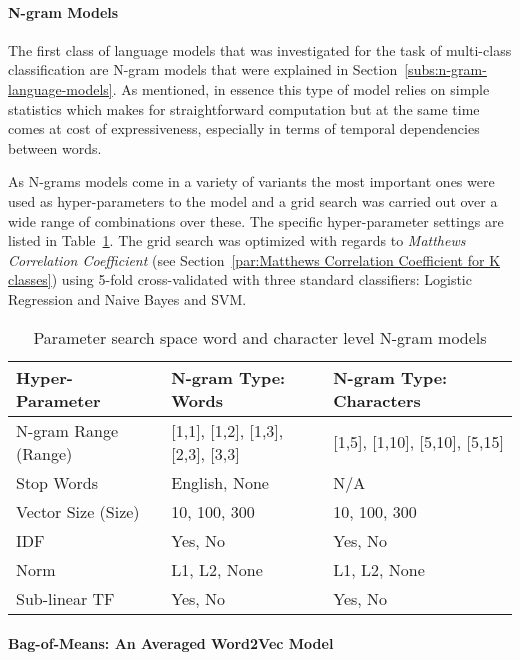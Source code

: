 \paragraph{N-gram Models}
\label{par:N-gram Models (Experiments)}

The first class of language models that was investigated for the task of multi-class classification are N-gram models that were explained in Section~\ref{subs:n-gram-language-models}. As mentioned, in essence this type of model relies on simple statistics which makes for straightforward computation but at the same time comes at cost of expressiveness, especially in terms of temporal dependencies between words.

As N-grams models come in a variety of variants the most important ones were used as hyper-parameters to the model and a grid search was carried out over a wide range of combinations over these. The specific hyper-parameter settings are listed in Table~\ref{tab:N-gram Hyper-parameters Space}. The grid search was optimized with regards to \emph{Matthews Correlation Coefficient} (see Section~\ref{par:Matthews Correlation Coefficient for K classes}) using 5-fold cross-validated with three standard classifiers: Logistic Regression and Naive Bayes and SVM.

\begin{table}[h]
  \begin{center}
  \begin{tabular}{ l l l}
    \toprule
    Hyper-Parameter & N-gram Type: Words & N-gram Type: Characters \\
    \midrule
    N-gram Range (Range) & [1,1], [1,2], [1,3], [2,3], [3,3] & [1,5], [1,10], [5,10], [5,15] \\
    Stop Words & English, None & N/A \\
    Vector Size (Size) & 10, 100, 300 & 10, 100, 300 \\
    IDF & Yes, No & Yes, No \\
    Norm & L1, L2, None & L1, L2, None \\
    Sub-linear TF & Yes, No & Yes, No \\
    \bottomrule
  \end{tabular}
  \caption{Parameter search space word and character level N-gram models}
\label{tab:N-gram Hyper-parameters Space}
\end{center}
\end{table}

\paragraph{Bag-of-Means: An Averaged Word2Vec Model}
\label{par:Bag-of-Means: An Averaged Word2Vec Model}

